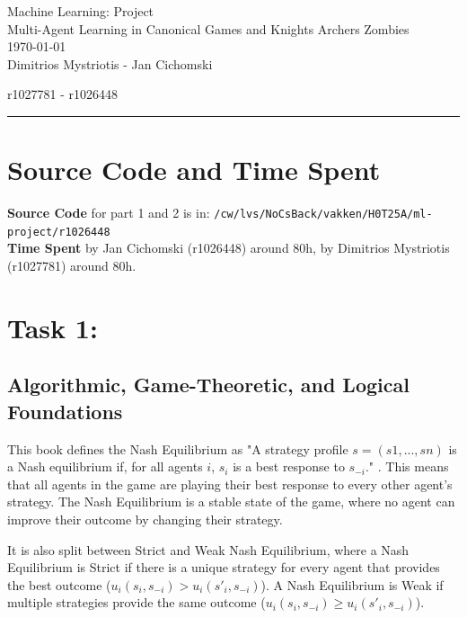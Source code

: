 \documentclass[12pt,a4paper, onecolumn]{exam}
\begin{document}
\begingroup
\centering
\LARGE Machine Learning: Project\\
\LARGE Multi-Agent Learning in Canonical Games and Knights Archers Zombies\\[0.5em]
\large \today\\[0.5em]
\large Dimitrios Mystriotis - Jan Cichomski\par
\large r1027781 - r1026448\par
\endgroup
\rule{\textwidth}{0.4pt}
\pointsdroppedatright   %
\printanswers
\renewcommand{\solutiontitle}{\noindent\textbf{Ans:}\enspace}   %
\section*{Source Code and Time Spent}
\textbf{Source Code} for part 1 and 2 is in: \texttt{/cw/lvs/NoCsBack/vakken/H0T25A/ml-project/r1026448}\\
\textbf{Time Spent} by Jan Cichomski (r1026448) around 80h, by Dimitrios Mystriotis (r1027781) around 80h.

\section{\textbf{Task 1:}}

\subsection{Algorithmic, Game-Theoretic, and Logical Foundations}
This book \cite{shoham} defines the Nash Equilibrium as "A strategy profile $s = (s1,... ,sn)$ is a Nash equilibrium if, for all agents $i$, $s_i$ is a best response to $s_{-i}$." \cite{shoham}.
This means that all agents in the game are playing their best response to every other agent's strategy. The Nash Equilibrium is a stable state of the game, where no agent can improve their outcome by changing their strategy.

It is also split between Strict and Weak Nash Equilibrium, where a Nash Equilibrium is Strict if there is a unique strategy for every agent that provides the best outcome ($u_i(s_i, s_{-i}) > u_i(s'_i,s_{-i})$).
A Nash Equilibrium is Weak if multiple strategies provide the same outcome ($u_i(s_i, s_{-i}) \geq u_i(s'_i,s_{-i})$).
\end{document}
